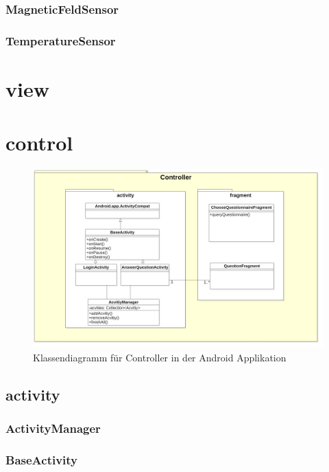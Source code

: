 \documentclass[a4paper]{scrreprt}
\begin{document}
                \subsubsection{MagneticFeldSensor}
                \subsubsection{TemperatureSensor}


        \section{view}



        \section{control}
            \begin{figure}[H]
                \centering
                \includegraphics[scale = 0.25]{ControllerDiagram(Android).jpg}
                \caption{Klassendiagramm für Controller in der Android Applikation }
            \end{figure}
            \subsection{activity}

                \subsubsection{ActivityManager}
                \subsubsection{BaseActivity}
\end{document}
